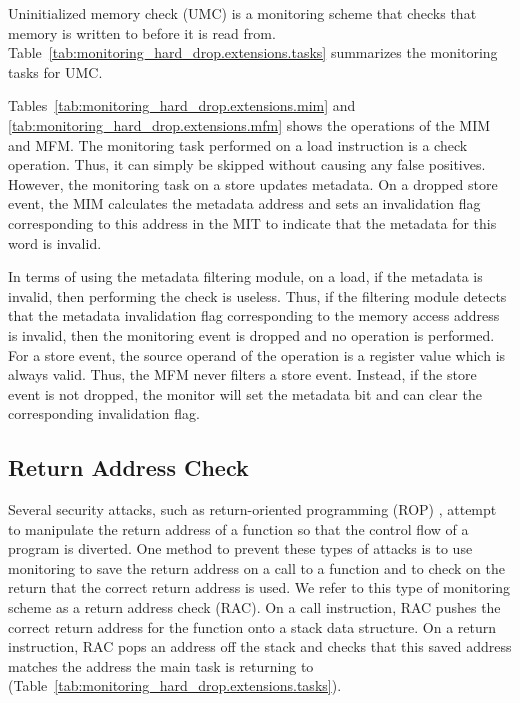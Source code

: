 Uninitialized memory check (UMC) is a monitoring scheme that checks that memory
is written to before it is read from.
Table~\ref{tab:monitoring_hard_drop.extensions.tasks} summarizes the monitoring
tasks for UMC.

Tables~\ref{tab:monitoring_hard_drop.extensions.mim} and
\ref{tab:monitoring_hard_drop.extensions.mfm} shows the operations of
the MIM and MFM. The monitoring task performed on a load instruction is a check
operation.  Thus, it can simply be skipped without causing any false positives.
However, the monitoring task on a store updates metadata. On a dropped store
event, the MIM calculates the metadata address and sets an invalidation flag
corresponding to this address in the MIT to indicate that the metadata for this
word is invalid.

In terms of using the metadata filtering module, on a load, if the metadata is
invalid, then performing the check is useless. Thus, if the filtering module
detects that the metadata invalidation flag corresponding to the memory access
address is invalid, then the monitoring event is dropped and no operation is
performed.  For a store event, the source operand of the operation is a
register value which is always valid. Thus, the MFM never filters a store
event. Instead, if the store event is not dropped, the monitor will set the
metadata bit and can clear the corresponding invalidation flag.

\subsection{Return Address Check}
\label{sec:monitoring_hard_drop.extensions.lrc}

Several security attacks, such as return-oriented programming (ROP)
\cite{rop-ccs07}, attempt to manipulate the return address of a
function so that the control flow of a program is diverted. One method to
prevent these types of attacks is to use monitoring to save the return address
on a call to a function and to check on the return that the correct return
address is used. We refer to this type of monitoring scheme as a return address
check (RAC). On a call instruction, RAC pushes the correct return address for
the function onto a stack data structure. On a return instruction, RAC pops an
address off the stack and checks that this saved address matches the address the
main task is returning to (Table~\ref{tab:monitoring_hard_drop.extensions.tasks}).

